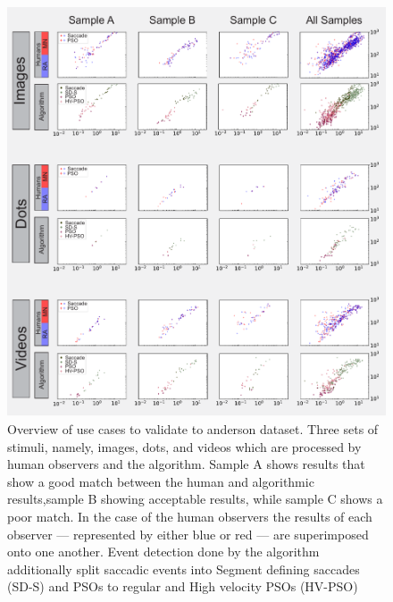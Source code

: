 

\begin{figure}[!ht]
\centering
\includegraphics[width=1\textwidth]{Mainseqs_legends.pdf}
\caption{\label{fig:Mainseqs}Overview of use cases to validate to anderson dataset. Three sets of stimuli, namely, images, dots, and videos which are processed by human observers and the algorithm. Sample A shows results that show a good match between the human and algorithmic results,sample B showing acceptable results, while sample C shows a poor match. In the case of the human observers the results of each observer --- represented by either blue or red --- are superimposed onto one another. Event detection done by the algorithm additionally split saccadic events into Segment defining saccades (SD-S) and PSOs to regular and High velocity PSOs (HV-PSO)  }

\end{figure}
